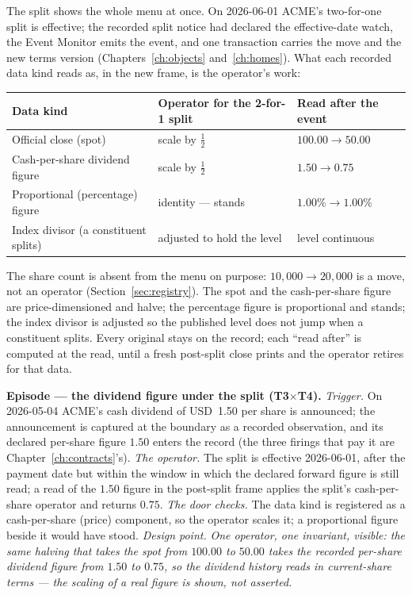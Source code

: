 \documentclass[11pt,a4paper]{article}
\newcommand{\USD}[1]{\mbox{USD~#1}}
\begin{document}
The split shows the whole menu at once. On 2026-06-01 ACME's two-for-one split is
effective; the recorded split notice had declared the effective-date watch, the Event
Monitor emits the event, and one transaction carries the move and the new terms version
(Chapters~\ref{ch:objects} and~\ref{ch:homes}). What each recorded data kind reads as, in
the new frame, is the operator's work:

\begin{center}
\begin{tabular}{@{}lll@{}}
\toprule
Data kind & Operator for the 2-for-1 split & Read after the event \\
\midrule
Official close (spot) & scale by $\tfrac12$ & $100.00 \rightarrow 50.00$ \\
Cash-per-share dividend figure & scale by $\tfrac12$ & $1.50 \rightarrow 0.75$ \\
Proportional (percentage) figure & identity --- stands & $1.00\% \rightarrow 1.00\%$ \\
Index divisor (a constituent splits) & adjusted to hold the level & level continuous \\
\bottomrule
\end{tabular}
\end{center}

\noindent The share count is absent from the menu on purpose: $10{,}000 \rightarrow
20{,}000$ is a move, not an operator (Section~\ref{sec:registry}). The spot and the
cash-per-share figure are price-dimensioned and halve; the percentage figure is
proportional and stands; the index divisor is adjusted so the published level does not jump
when a constituent splits. Every original stays on the record; each ``read after'' is
computed at the read, until a fresh post-split close prints and the operator retires for
that data.

\medskip\noindent\textbf{Episode --- the dividend figure under the split (T3$\times$T4).}
\emph{Trigger.} On 2026-05-04 ACME's cash dividend of \USD{1.50} per share is announced;
the announcement is captured at the boundary as a recorded observation, and its declared
per-share figure $1.50$ enters the record (the three firings that pay it are
Chapter~\ref{ch:contracts}'s). \emph{The operator.} The split is effective 2026-06-01,
after the payment date but within the window in which the declared forward figure is still
read; a read of the $1.50$ figure in the post-split frame applies the split's
cash-per-share operator and returns $0.75$. \emph{The door checks.} The data kind is
registered as a cash-per-share (price) component, so the operator scales it; a proportional
figure beside it would have stood. \emph{Design point.} \emph{One operator, one invariant,
visible: the same halving that takes the spot from $100.00$ to $50.00$ takes the recorded
per-share dividend figure from $1.50$ to $0.75$, so the dividend history reads in
current-share terms --- the scaling of a real figure is shown, not asserted.}
\end{document}

